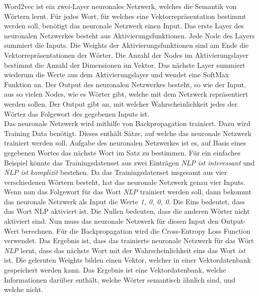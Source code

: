 Word2vec ist ein zwei-Layer neuronales Netzwerk, welches die Semantik von Wörtern lernt.
Für jedes Wort, für welches eine Vektorrepräsentation bestimmt werden soll, benötigt das neuronale Netzwerk einen Input.
Das erste Layer des neuronalen Netzwerkes besteht aus Aktivierungsfunktionen.
Jede Node des Layers summiert die Inputs.
Die Weights der Aktivierungsfunktionen sind am Ende die Vektorrepräsentationen der Wörter.
Die Anzahl der Nodes im Aktivierungslayer bestimmt die Anzahl der Dimensionen im Vektor.
Das nächste Layer summiert wiederum die Werte aus dem Aktivierungslayer und wendet eine SoftMax Funktion an.
Der Output des neuronalen Netzwerkes besteht, so wie der Input, aus so vielen Nodes, wie es Wörter gibt, welche mit dem Netzwerk repräsentiert werden sollen.
Der Output gibt an, mit welcher Wahrscheinlichkeit jedes der Wörter das Folgewort des gegebenen Inputs ist.\\ 

Das neuronale Netzwerk wird mithilfe von Backpropagation trainiert.
Dazu wird Training Data benötigt.
Dieses enthält Sätze, auf welche das neuronale Netzwerk trainiert werden soll.
Aufgabe des neuronalen Netzwerkes ist es, auf Basis eines gegebenen Wortes das nächste Wort im Satz zu bestimmen.
Für ein einfaches Beispiel könnte das Trainingsdatenset aus zwei Einträgen \textit{NLP ist interessant} und \textit{NLP ist komplizit} bestehen.
Da das Trainingsdatenset insgesamt aus vier verschiedenen Wörtern besteht, hat das neuronale Netzwerk genau vier Inputs.
Wenn nun das Folgewort für das Wort \textit{NLP} trainiert werden soll, dann bekommt das neuronale Netzwerk als Input die Werte \textit{1, 0, 0, 0}.
Die Eins bedeutet, dass das Wort NLP aktiviert ist.
Die Nullen bedeuten, dass die anderen Wörter nicht aktiviert sind.
Nun muss das neuronale Netzwerk für diesen Input den Output-Wert berechnen.
Für die Backpropagation wird die Cross-Entropy Loss Function verwendet.
Das Ergebnis ist, dass das trainierte neuronale Netzwerk für das Wört \textit{NLP} lernt, dass das nächste Wort mit der Wahrscheinlichkeit eins das Wort \textit{ist} ist.
Die gelernten Weights bilden einen Vektor, welcher in einer Vektordatenbank gespeichert werden kann.
Das Ergebnis ist eine Vektordatenbank, welche Informationen darüber enthält, welche Wörter semantisch ähnlich sind, und welche nicht.

